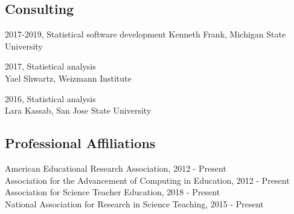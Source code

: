 \documentclass[14,]{article}
\begin{document}
\hypertarget{consulting}{%
\subsection{Consulting}\label{consulting}}

2017-2019, Statistical software development Kenneth Frank, Michigan
State University

2017, Statistical analysis\\
Yael Shwartz, Weizmann Institute

2016, Statistical analysis\\
Lara Kassab, San Jose State University

\hypertarget{professional-affiliations}{%
\subsection{Professional Affiliations}\label{professional-affiliations}}

American Educational Research Association, 2012 - Present\\
Association for the Advancement of Computing in Education, 2012 -
Present\\
Association for Science Teacher Education, 2018 - Present\\
National Association for Research in Science Teaching, 2015 - Present
\end{document}

